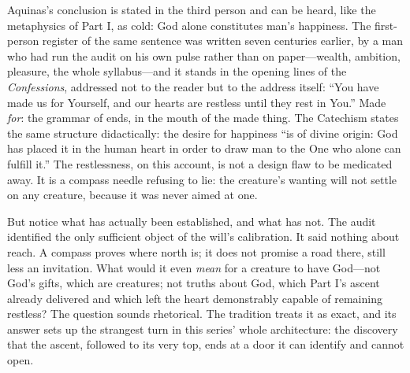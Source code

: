 Aquinas's conclusion is stated in the third person and can be heard, like the metaphysics of Part I, as cold: God alone constitutes man's happiness. The first-person register of the same sentence was written seven centuries earlier, by a man who had run the audit on his own pulse rather than on paper---wealth, ambition, pleasure, the whole syllabus---and it stands in the opening lines of the \emph{Confessions}, addressed not to the reader but to the address itself: ``You have made us for Yourself, and our hearts are restless until they rest in You.'' Made \emph{for}: the grammar of ends, in the mouth of the made thing. The Catechism states the same structure didactically: the desire for happiness ``is of divine origin: God has placed it in the human heart in order to draw man to the One who alone can fulfill it.'' The restlessness, on this account, is not a design flaw to be medicated away. It is a compass needle refusing to lie: the creature's wanting will not settle on any creature, because it was never aimed at one.

But notice what has actually been established, and what has not. The audit identified the only sufficient object of the will's calibration. It said nothing about reach. A compass proves where north is; it does not promise a road there, still less an invitation. What would it even \emph{mean} for a creature to have God---not God's gifts, which are creatures; not truths about God, which Part I's ascent already delivered and which left the heart demonstrably capable of remaining restless? The question sounds rhetorical. The tradition treats it as exact, and its answer sets up the strangest turn in this series' whole architecture: the discovery that the ascent, followed to its very top, ends at a door it can identify and cannot open.

